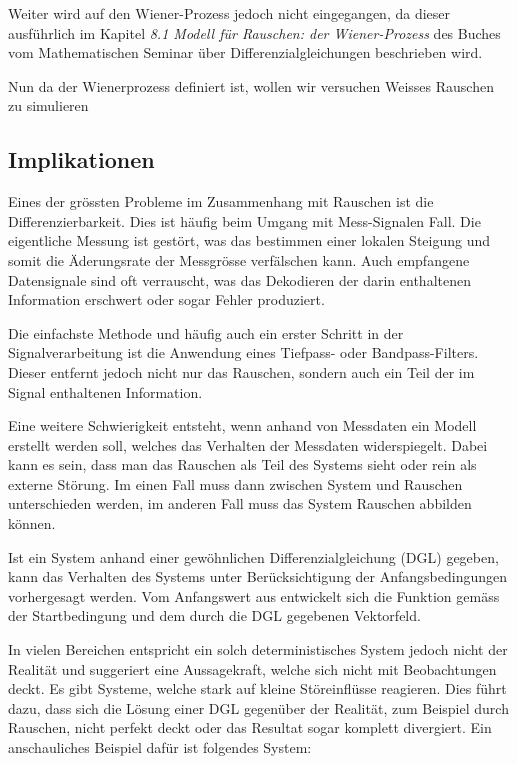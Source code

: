 Weiter wird auf den Wiener-Prozess jedoch nicht eingegangen, da dieser ausführlich im Kapitel \glqq \textit{8.1 Modell für Rauschen: der Wiener-Prozess}\glqq{} des Buches %
 vom Mathematischen Seminar über Differenzialgleichungen beschrieben wird.

Nun da der Wienerprozess definiert ist, wollen wir versuchen Weisses Rauschen zu simulieren


\subsection{Implikationen\label{brown:Rauschen:Implikationen}}

Eines der grössten Probleme im Zusammenhang mit Rauschen ist die Differenzierbarkeit. Dies ist häufig beim Umgang mit Mess-Signalen Fall. Die eigentliche Messung ist gestört, was das bestimmen einer lokalen Steigung und somit die Äderungsrate der Messgrösse verfälschen kann. Auch empfangene Datensignale sind oft verrauscht, was das Dekodieren der darin enthaltenen Information erschwert oder sogar Fehler produziert.

Die einfachste Methode und häufig auch ein erster Schritt in der Signalverarbeitung ist die Anwendung eines Tiefpass- oder Bandpass-Filters. Dieser entfernt jedoch nicht nur das Rauschen, sondern auch ein Teil der im Signal enthaltenen Information.

Eine weitere Schwierigkeit entsteht, wenn anhand von Messdaten ein Modell erstellt werden soll, welches das Verhalten der Messdaten widerspiegelt. Dabei kann es sein, dass man das Rauschen als Teil des Systems sieht oder rein als externe Störung. Im einen Fall muss dann zwischen System und Rauschen unterschieden werden, im anderen Fall muss das System Rauschen abbilden können.

Ist ein System anhand einer gewöhnlichen Differenzialgleichung (DGL) gegeben, kann das Verhalten des Systems unter Berücksichtigung der Anfangsbedingungen vorhergesagt werden. Vom Anfangswert aus entwickelt sich die Funktion gemäss der Startbedingung und dem durch die DGL gegebenen Vektorfeld. 

In vielen Bereichen entspricht ein solch deterministisches System jedoch nicht der Realität und suggeriert eine Aussagekraft, welche sich nicht mit Beobachtungen deckt. Es gibt Systeme, welche stark auf kleine Störeinflüsse reagieren. Dies führt dazu, dass sich die Lösung einer DGL gegenüber der Realität, zum Beispiel durch Rauschen, nicht perfekt deckt oder das Resultat sogar komplett divergiert. Ein anschauliches Beispiel dafür ist folgendes System:

